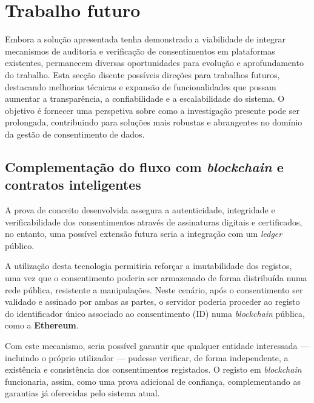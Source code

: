 
\section{Trabalho futuro}

Embora a solução apresentada tenha demonstrado a viabilidade de integrar mecanismos de auditoria e verificação de consentimentos em plataformas existentes, permanecem diversas oportunidades para evolução e aprofundamento do trabalho. Esta secção discute possíveis direções para trabalhos futuros, destacando melhorias técnicas e expansão de funcionalidades que possam aumentar a transparência, a confiabilidade e a escalabilidade do sistema. O objetivo é fornecer uma perspetiva sobre como a investigação presente pode ser prolongada, contribuindo para soluções mais robustas e abrangentes no domínio da gestão de consentimento de dados.

\subsection{Complementação do fluxo com \textit{blockchain} e contratos inteligentes}

A prova de conceito desenvolvida assegura a autenticidade, integridade e verificabilidade dos consentimentos através de assinaturas digitais e certificados, no entanto, uma possível extensão futura seria a integração com um \textit{ledger} público.

A utilização desta tecnologia permitiria reforçar a imutabilidade dos registos, uma vez que o consentimento poderia ser armazenado de forma distribuída numa rede pública, resistente a manipulações. Neste cenário, após o consentimento ser validado e assinado por ambas as partes, o servidor poderia proceder ao registo do identificador único associado ao consentimento (ID) numa \textit{blockchain} pública, como a \textbf{Ethereum}.  

Com este mecanismo, seria possível garantir que qualquer entidade interessada — incluindo o próprio utilizador — pudesse verificar, de forma independente, a existência e consistência dos consentimentos registados. O registo em \textit{blockchain} funcionaria, assim, como uma prova adicional de confiança, complementando as garantias já oferecidas pelo sistema atual.  


